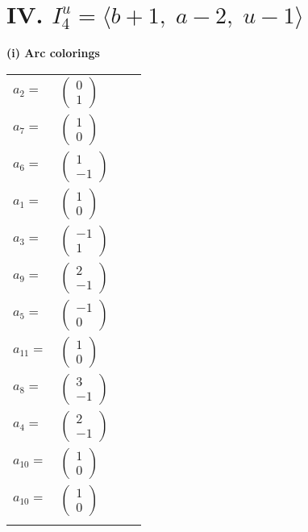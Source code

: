 \documentclass[1p]{elsarticle_modified}
\theoremstyle{definition}
\begin{document}
\centering \section*{IV. $I^u_{4}= \langle b+1,\;a-2,\;u-1 \rangle$}
\flushleft \textbf{(i) Arc colorings}\\
\begin{tabular}{m{7pt} m{180pt} m{7pt} m{180pt} }
\flushright $a_{2}=$&$\begin{pmatrix}0\\1\end{pmatrix}$ \\
\flushright $a_{7}=$&$\begin{pmatrix}1\\0\end{pmatrix}$ \\
\flushright $a_{6}=$&$\begin{pmatrix}1\\-1\end{pmatrix}$ \\
\flushright $a_{1}=$&$\begin{pmatrix}1\\0\end{pmatrix}$ \\
\flushright $a_{3}=$&$\begin{pmatrix}-1\\1\end{pmatrix}$ \\
\flushright $a_{9}=$&$\begin{pmatrix}2\\-1\end{pmatrix}$ \\
\flushright $a_{5}=$&$\begin{pmatrix}-1\\0\end{pmatrix}$ \\
\flushright $a_{11}=$&$\begin{pmatrix}1\\0\end{pmatrix}$ \\
\flushright $a_{8}=$&$\begin{pmatrix}3\\-1\end{pmatrix}$ \\
\flushright $a_{4}=$&$\begin{pmatrix}2\\-1\end{pmatrix}$ \\
\flushright $a_{10}=$&$\begin{pmatrix}1\\0\end{pmatrix}$\\ \flushright $a_{10}=$&$\begin{pmatrix}1\\0\end{pmatrix}$\\&\end{tabular}
\end{document}
